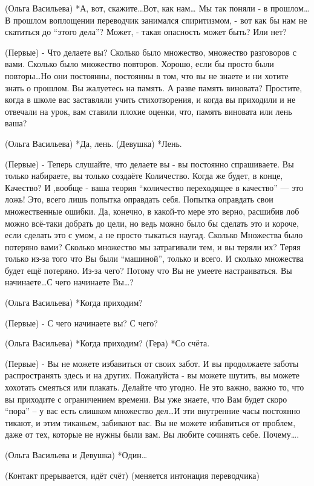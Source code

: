 (Ольга Васильева) *А, вот, скажите…Вот,  как нам… Мы так поняли - в прошлом…В прошлом воплощении переводчик занимался спиритизмом, - вот как бы нам не скатиться до “этого дела”? Может, - такая опасность может быть? Или нет?

(Первые) - Что делаете вы? Сколько было множество, множество разговоров с вами. Сколько было множество повторов. Хорошо, если бы просто были повторы…Но они постоянны, постоянны в том, что вы не знаете и ни хотите знать о прошлом. Вы жалуетесь на память. А разве память виновата? Простите, когда в школе вас заставляли учить стихотворения, и когда вы приходили и не отвечали на урок, вам ставили плохие оценки, что, память виновата или лень ваша?

(Ольга Васильева) *Да, лень.
(Девушка) *Лень.

(Первые) - Теперь слушайте, что делаете вы - вы постоянно спрашиваете. Вы только набираете, вы только создаёте Количество. Когда же будет, в конце, Качество? И ,вообще - ваша теория “количество переходящее в качество” — это ложь! Это, всего лишь попытка оправдать себя. Попытка оправдать свои множественные ошибки. Да, конечно, в какой-то мере это верно, расшибив лоб можно всё-таки добрать до цели, но ведь можно было бы сделать это и короче, если сделать это с умом, а не просто тыкаться наугад. Сколько Множества было потеряно вами? Сколько множество мы затрагивали тем, и вы теряли их? Теряя только из-за того что Вы были “машиной”, только и всего. И сколько множества будет ещё потеряно. Из-за чего? Потому что Вы не умеете настраиваться. Вы начинаете…С чего начинаете Вы…?

(Ольга Васильева) *Когда приходим?

(Первые) - С чего начинаете вы? С чего?

(Ольга Васильева) *Когда приходим?
(Гера) *Со счёта.

(Первые) - Вы не можете избавиться от своих забот. И вы продолжаете заботы распространять здесь и на других. Пожалуйста - вы можете шутить, вы можете хохотать смеяться или плакать. Делайте что угодно. Не это важно, важно то, что вы приходите с ограничением времени. Вы уже знаете, что Вам будет скоро “пора” –  у вас есть слишком множество дел…И эти внутренние часы постоянно тикают, и этим тиканьем, забивают вас. Вы не можете избавиться от проблем, даже от тех, которые не нужны были  вам. Вы любите сочинять себе. Почему….

(Ольга Васильева и Девушка) *Один…

(Контакт прерывается, идёт счёт)
(меняется интонация переводчика)

